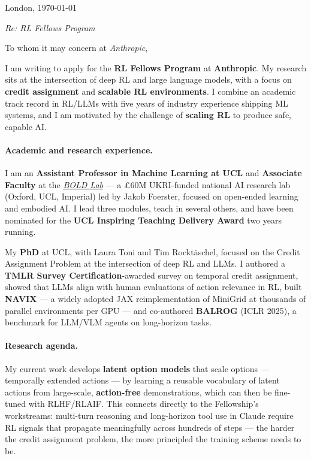 \documentclass[hidelinks,11pt,a4paper]{article}
\renewcommand{\emph}[1]{\textcolor{dblue}{\textbf{#1}}}
\newcommand{\link}[2]{\textit{\textcolor{black}{\href{#1}{\ul{#2}}}}}
\begin{document}
\pagestyle{empty}
\hfill
London, \today
\vspace{1em}

\hfill
\noindent\textit{Re: RL Fellows Program}
\vspace{2em}

\noindent To whom it may concern at \textit{Anthropic},
\vspace{1em}

\noindent
I am writing to apply for the \emph{RL Fellows Program} at \textbf{Anthropic}.
My research sits at the intersection of deep RL and large language models, with a focus on \emph{credit assignment} and \emph{scalable RL environments}.
I combine an academic track record in RL/LLMs with five years of industry experience shipping ML systems, and I am motivated by the challenge of \emph{scaling RL} to produce safe, capable AI.

\paragraph{Academic and research experience.}
I am an \emph{Assistant Professor in Machine Learning at UCL} and \emph{Associate Faculty} at the \link{https://bold-lab.ai/}{BOLD Lab} — a £60M UKRI-funded national AI research lab (Oxford, UCL, Imperial) led by Jakob Foerster, focused on open-ended learning and embodied AI.
I lead three modules, teach in several others, and have been nominated for the \emph{UCL Inspiring Teaching Delivery Award} two years running.

My \emph{PhD} at UCL, with Laura Toni and Tim Rocktäschel, focused on the Credit Assignment Problem at the intersection of deep RL and LLMs.
I authored a \emph{TMLR Survey Certification}-awarded survey on temporal credit assignment, showed that LLMs align with human evaluations of action relevance in RL, built \emph{NAVIX} — a widely adopted JAX reimplementation of MiniGrid at thousands of parallel environments per GPU — and co-authored \emph{BALROG} (ICLR 2025), a benchmark for LLM/VLM agents on long-horizon tasks.

\paragraph{Research agenda.}
My current work develops \emph{latent option models} that scale options — temporally extended actions — by learning a reusable vocabulary of latent actions from large-scale, \emph{action-free} demonstrations, which can then be fine-tuned with RLHF/RLAIF.
This connects directly to the Fellowship's workstreams: multi-turn reasoning and long-horizon tool use in Claude require RL signals that propagate meaningfully across hundreds of steps — the harder the credit assignment problem, the more principled the training scheme needs to be.
\end{document}

